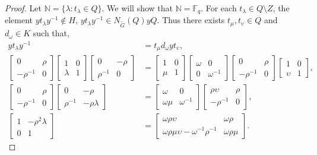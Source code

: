 \begin{proof}
Let $\mathbb{N} = \{ \lambda : t_\lambda \in Q \}$. We will show that $\mathbb{N} =\mathbb{F}_q$. For each $t_\lambda \in Q \setminus Z$, the element $y t_\lambda y^{-1} \notin H$, $y t_\lambda y^{-1} \in N_{\widetilde{G}}(Q) y Q$. Thus there exists $t_\mu, t_\upsilon \in Q$ and $d_\omega \in K$ such that,
\begin{align*} y t_\lambda y^{-1} &= t_\mu d_\omega y t_\upsilon,
\\[1.5ex] \begin{bmatrix} 0 & \rho \\ -\rho^{-1} & 0 \end{bmatrix}\begin{bmatrix} 1 & 0 \\ \lambda & 1 \end{bmatrix}\begin{bmatrix} 0 & -\rho \\ \rho^{-1} & 0 \end{bmatrix} &= \begin{bmatrix} 1 & 0 \\ \mu & 1 \end{bmatrix}\begin{bmatrix} \omega & 0 \\ 0 & \omega^{-1} \end{bmatrix}\begin{bmatrix} 0 & \rho \\ -\rho^{-1} & 0 \end{bmatrix}\begin{bmatrix} 1 & 0 \\ \upsilon & 1 \end{bmatrix},
\\[1.5ex] \begin{bmatrix} 0 & \rho \\ -\rho^{-1} & 0 \end{bmatrix}\begin{bmatrix} 0 & -\rho \\ \rho^{-1} & -\rho \lambda \end{bmatrix} &= \begin{bmatrix} \omega & 0 \\ \omega \mu & \omega^{-1} \end{bmatrix}\begin{bmatrix} \rho \upsilon & \rho \\ -\rho^{-1} & 0 \end{bmatrix},
\\[1.5ex] \begin{bmatrix} 1 & -\rho^2 \lambda \\ 0 & 1 \end{bmatrix} &= \begin{bmatrix} \omega \rho \upsilon & \omega \rho \\ \omega \rho \mu \upsilon - \omega^{-1} \rho^{-1} & \omega \rho \mu \end{bmatrix}.
\end{align*}


\end{proof}
